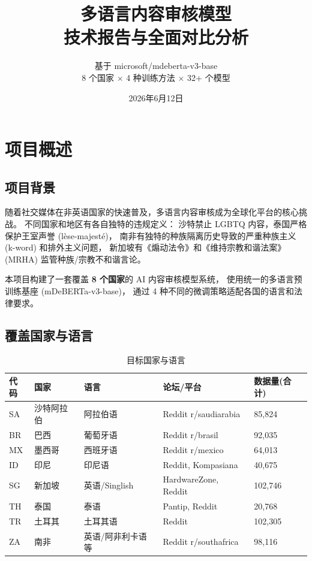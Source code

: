 \documentclass[11pt,a4paper]{article}
\title{\textbf{多语言内容审核模型\\技术报告与全面对比分析}}
\author{基于 microsoft/mdeberta-v3-base \\ 8 个国家 $\times$ 4 种训练方法 $\times$ 32+ 个模型}
\date{2026年6月12日}
\begin{document}
\maketitle
\tableofcontents
\newpage

\section{项目概述}

\subsection{项目背景}

随着社交媒体在非英语国家的快速普及，多语言内容审核成为全球化平台的核心挑战。
不同国家和地区有各自独特的违规定义：
沙特禁止 LGBTQ 内容，泰国严格保护王室声誉 (l\`{e}se-majest\'{e})，
南非有独特的种族隔离历史导致的严重种族主义 (k-word) 和排外主义问题，
新加坡有《煽动法令》和《维持宗教和谐法案》(MRHA) 监管种族/宗教不和谐言论。

本项目构建了一套覆盖 \textbf{8 个国家}的 AI 内容审核模型系统，
使用统一的多语言预训练基座 (mDeBERTa-v3-base)，
通过 4 种不同的微调策略适配各国的语言和法律要求。

\subsection{覆盖国家与语言}

\begin{table}[h]\centering
\caption{目标国家与语言}\label{tab:countries}
\begin{tabular}{@{}lllll@{}}\toprule
\textbf{代码} & \textbf{国家} & \textbf{语言} & \textbf{论坛/平台} & \textbf{数据量(合计)} \\\midrule
SA & 沙特阿拉伯 & 阿拉伯语 & Reddit r/saudiarabia & 85,824 \\
BR & 巴西 & 葡萄牙语 & Reddit r/brasil & 92,035 \\
MX & 墨西哥 & 西班牙语 & Reddit r/mexico & 64,013 \\
ID & 印尼 & 印尼语 & Reddit, Kompasiana & 40,675 \\
SG & 新加坡 & 英语/Singlish & HardwareZone, Reddit & 102,746 \\
TH & 泰国 & 泰语 & Pantip, Reddit & 20,768 \\
TR & 土耳其 & 土耳其语 & Reddit & 102,305 \\
ZA & 南非 & 英语/阿非利卡语等 & Reddit r/southafrica & 98,116 \\
\bottomrule
\end{tabular}
\end{table}
\end{document}
